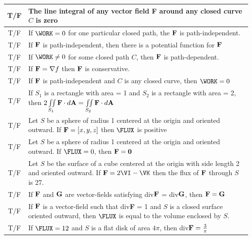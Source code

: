 \documentclass[12pt]{amsart}
\numberwithin{equation}{section}
\begin{document}
\vspace{0.1cm}

	\setlength{\extrarowheight}{0.2cm}
	\begin{tabular}{| c | p{17.2cm} |}
		\hline
		T\quad/\quad F & The line integral of any vector field {\bf F} around any closed curve $C$ is zero\\
		\hline
		T\quad/\quad F & If $\WORK = 0$ for one particular closed path, the ${\bf F}$ is path-independent.\\
		\hline
		T\quad/\quad F & If ${\bf F}$ is path-independent, then there is a potential function for ${\bf F}$\\
		\hline
		T\quad/\quad F & If $\WORK \ne 0$ for some closed path $C$, then ${\bf F}$ is path-dependent.\\
		\hline
		T\quad/\quad F & If ${\bf F} = \nabla f$ then ${\bf F}$ is conservative.\\
		\hline
		T\quad/\quad F & If ${\bf F}$ is path-independent and $C$ is any closed curve, then $\WORK = 0$\\
		\hline
		T\quad/\quad F & If $S_1$ is a rectangle with area = 1 and $S_2$ is a rectangle with area = 2, then
$2\iint \limits_{S_1} {\bf F} \cdot d{\bf A} = \iint \limits_{S_2} {\bf F} \cdot d{\bf A}$\\
		\hline
		T\quad/\quad F & Let $S$ be a sphere of radius 1 centered at the origin and oriented outward.  If ${\bf F} = [x,y,z]$ then $\FLUX$ is positive\\
		\hline
		T\quad/\quad F & Let $S$ be a sphere of radius 1 centered at the origin and oriented outward.  If $\FLUX = 0$, then ${\bf F} = {\bf 0}$\\
		\hline
		T\quad/\quad F & Let $S$ be the surface of a cube centered at the origin with side length 2 and oriented outward.  If ${\bf F} = 2\VI - \VK$ then the flux of ${\bf F}$ through $S$ is 27.\\
		\hline
		T\quad/\quad F & If ${\bf F}$ and ${\bf G}$ are vector-fields satisfying div${\bf F}$ = div${\bf G}$, then ${\bf F} = {\bf G}$\\
		\hline
		T\quad/\quad F & If ${\bf F}$ is a vector-field such that div{\bf F} = 1 and $S$ is a closed surface oriented outward, then $\FLUX$ is equal to the volume enclosed by $S$.\\
		\hline
		T\quad/\quad F & If $\FLUX = 12$ and $S$ is a flat disk of area $4\pi$, then div${\bf F} = \frac{3}{\pi}$\\
		\hline
	\end{tabular}
\end{document}
